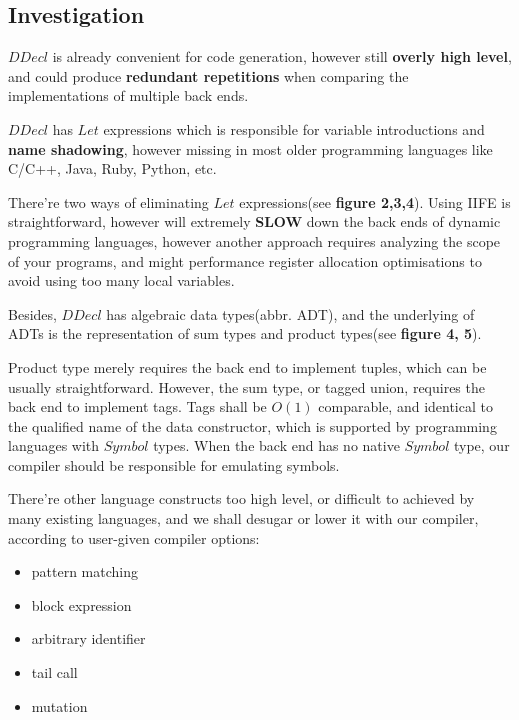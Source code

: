 \documentclass[a1,portrait]{a1poster}
\begin{document}
\begin{multicols}{2}
\captionsetup{font=normalsize}

\vspace {-0.5cm}
\section*{Investigation}

$DDecl$ is already convenient for code generation, however still \textbf{overly high level}, and could produce
\textbf{redundant repetitions} when comparing the implementations of multiple back ends.


$DDecl$ has $Let$ expressions which is responsible for variable introductions
and \textbf{name shadowing}, however missing in most older programming languages like C/C++, Java, Ruby, Python, etc.

There're two ways of eliminating $Let$ expressions(see \textbf{figure 2,3,4}). Using IIFE is straightforward,
however will extremely \textbf{SLOW} down the back ends of dynamic programming languages, however another
approach requires analyzing the scope of your programs, and might performance register allocation optimisations
to avoid using too many local variables. 


Besides, $DDecl$ has algebraic data types(abbr. ADT),
and the underlying of ADTs is the representation of sum types and product types(see \textbf{figure 4, 5}).

Product type merely requires the back end to implement tuples, which can be usually straightforward.
However, the sum type, or tagged union, requires the back end to implement tags.
Tags shall be $O(1)$ comparable, and identical to the qualified name of the data constructor, which is
supported by programming languages with $Symbol$ types. When the back end has no native $Symbol$ type,
our compiler should be responsible for emulating symbols.

There're other language constructs too high level, or difficult to achieved by many existing languages,
and we shall desugar or lower it with our compiler, according to user-given compiler options:
\vspace{-0.2cm}
\begin{itemize}
    \setlength\itemsep{-0.13em}
    \item pattern matching
    \item block expression \cite{gcc-stmt-expr} \cite{pep572}
    \item arbitrary identifier
    \item tail call
    \item mutation
\end{itemize}


\end{multicols}
\end{document}
